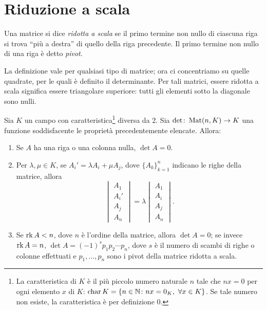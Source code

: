 \section{Riduzione a scala}
\begin{definizione}
	Una matrice si dice \emph{ridotta a scala} se il primo termine non nullo di ciascuna riga si trova ``più a destra'' di quello della riga precedente.
	Il primo termine non nullo di una riga è detto \emph{pivot}.
\end{definizione}
La definizione vale per qualsiasi tipo di matrice; ora ci concentriamo su quelle quadrate, per le quali è definito il determinante.
Per tali matrici, essere ridotta a scala significa essere triangolare superiore: tutti gli elementi sotto la diagonale sono nulli.
\begin{proprieta}
	Sia $K$ un campo con caratteristica\footnote{
		La caratteristica di $K$ è il più piccolo numero naturale $n$ tale che $nx=0$ per ogni elemento $x$ di $K$: $\operatorname{char} K=\{n\in\mathbb{N}\colon nx=0_K,\ \forall x\in K\}$. Se tale numero non esiste, la caratteristica è per definizione 0.
	}
	diversa da 2.
	Sia $\det\colon\operatorname{Mat}(n,K)\to K$ una funzione soddisfacente le proprietà precedentemente elencate.
	Allora:
	\begin{enumerate}
		\item Se $A$ ha una riga o una colonna nulla, $\det A=0$.
		\item Per $\lambda,\mu\in K$, se $A_i'=\lambda A_i+\mu A_j$, dove $\{A_k\}_{k=1}^n$ indicano le righe della matrice, allora
		\begin{equation*}
			\begin{vmatrix}
				A_1\\A_i'\\A_j\\A_n
			\end{vmatrix}
			=\lambda
			\begin{vmatrix}
				A_1\\A_i\\A_j\\A_n
			\end{vmatrix}.
		\end{equation*}
		\item Se $\operatorname{rk} A<n$, dove $n$ è l'ordine della matrice, allora $\det A=0$; se invece $\operatorname{rk} A=n$, $\det A=(-1)^sp_1p_2\cdots p_n$, dove $s$ è il numero di scambi di righe o colonne effettuati e $p_1,\dots,p_n$ sono i pivot della matrice ridotta a scala.
	\end{enumerate}
\end{proprieta}
